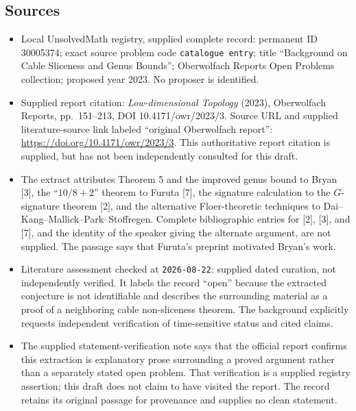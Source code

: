 \documentclass[11pt]{article}
\begin{document}
\subsection{Sources}
\begin{itemize}
\item Local UnsolvedMath registry, supplied complete record: permanent ID 30005374; exact source problem code \texttt{catalogue entry}; title ``Background on Cable Sliceness and Genus Bounds''; Oberwolfach Reports Open Problems collection; proposed year 2023. No proposer is identified.
\item Supplied report citation: \emph{Low-dimensional Topology} (2023), Oberwolfach Reports, pp.\ 151--213, DOI 10.4171/owr/2023/3. Source URL and supplied literature-source link labeled ``original Oberwolfach report'': \url{https://doi.org/10.4171/owr/2023/3}. This authoritative report citation is supplied, but has not been independently consulted for this draft.
\item The extract attributes Theorem 5 and the improved genus bound to Bryan [3], the ``\(10/8+2\)'' theorem to Furuta [7], the signature calculation to the \(G\)-signature theorem [2], and the alternative Floer-theoretic techniques to Dai--Kang--Mallick--Park--Stoffregen. Complete bibliographic entries for [2], [3], and [7], and the identity of the speaker giving the alternate argument, are not supplied. The passage says that Furuta's preprint motivated Bryan's work.
\item Literature assessment checked at \texttt{2026-08-22}: supplied dated curation, not independently verified. It labels the record ``open'' because the extracted conjecture is not identifiable and describes the surrounding material as a proof of a neighboring cable non-sliceness theorem. The background explicitly requests independent verification of time-sensitive status and cited claims.
\item The supplied statement-verification note says that the official report confirms this extraction is explanatory prose surrounding a proved argument rather than a separately stated open problem. That verification is a supplied registry assertion; this draft does not claim to have visited the report. The record retains its original passage for provenance and supplies no clean statement.
\end{itemize}
\end{document}
